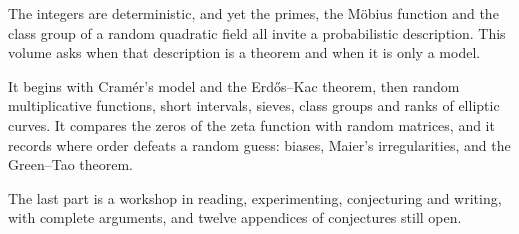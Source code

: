 The integers are deterministic, and yet the primes, the M\"obius function and the class group of a random quadratic field all invite a probabilistic description.
This volume asks when that description is a theorem and when it is only a model.\par\medskip
It begins with Cram\'er's model and the Erd\H os--Kac theorem, then random multiplicative functions, short intervals, sieves, class groups and ranks of elliptic curves.
It compares the zeros of the zeta function with random matrices, and it records where order defeats a random guess: biases, Maier's irregularities, and the Green--Tao theorem.\par\medskip
The last part is a workshop in reading, experimenting, conjecturing and writing, with complete arguments, and twelve appendices of conjectures still open.
